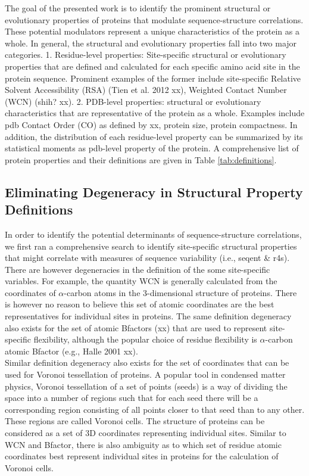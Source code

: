 \documentclass[11pt]{article}
\begin{document}
    The goal of the presented work is to identify the prominent structural or evolutionary properties of proteins that modulate sequence-structure correlations. These potential modulators represent a unique characteristics of the protein as a whole.  In general, the structural and evolutionary properties fall into two major categories. 1. Residue-level properties: Site-specific structural or evolutionary properties that are defined and calculated for each specific amino acid site in the protein sequence. Prominent examples of the former include site-specific Relative Solvent Accessibility (RSA) (Tien et al. 2012 xx), Weighted Contact Number (WCN) (shih? xx).   2. PDB-level properties: structural or evolutionary characteristics that are representative of the protein as a whole. Examples include pdb Contact Order (CO) as defined by xx, protein size, protein compactness.  In addition, the distribution of each residue-level property can be summarized by its statistical moments as pdb-level property of the protein. A comprehensive list of protein properties and their definitions are given in Table \ref{tab:definitions}.

    \subsection*{Eliminating Degeneracy in Structural Property Definitions}

    In order to identify the potential determinants of sequence-structure correlations, we first ran a comprehensive search to identify site-specific structural properties that might correlate with measures of sequence variability (i.e., seqent \& r4s). There are however degeneracies in the definition of the some site-specific variables. For example, the quantity WCN is generally calculated from the coordinates of $\alpha$-carbon atoms in the 3-dimensional structure of proteins. There is however no reason to believe this set of atomic coordinates are the best representatives for individual sites in proteins. The same definition degeneracy also exists for the set of atomic Bfactors (xx) that are used to represent site-specific flexibility, although the popular choice of residue flexibility is $\alpha$-carbon atomic Bfactor (e.g., Halle 2001 xx).
    \\
    
    Similar definition degeneracy also exists for the set of coordinates that can be used for Voronoi tessellation of proteins. A popular tool in condensed matter physics, Voronoi tessellation of a set of points (seeds) is a way of dividing the space into a number of regions such that for each seed there will be a corresponding region consisting of all points closer to that seed than to any other. These regions are called Voronoi cells. The structure of proteins can be considered as a set of 3D coordinates representing individual sites. Similar to WCN and Bfactor, there is also ambiguity as to which set of residue atomic coordinates best represent individual sites in proteins for the calculation of Voronoi cells.
    \\
\end{document}
